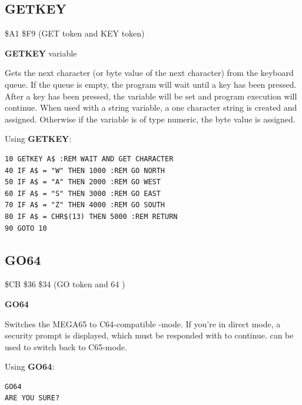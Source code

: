 \subsection{GETKEY}
\begin{description}[leftmargin=2cm,style=nextline]
\item [Token:] \$A1 \$F9 (GET token and KEY token)
\item [Format:] {\bf GETKEY} variable
\item [Usage:] Gets the next character (or byte value of the next character)
               from the keyboard queue. If the queue is empty,
               the program will wait until a key has been pressed.
               After a key has been pressed, the variable will be set
               and program execution will continue. When used with
               a string variable, a one character string is created and assigned.
               Otherwise if the variable is of type numeric, the byte value
               is assigned.

\item [Example:] Using {\bf GETKEY}:
\begin{tcolorbox}[colback=black,coltext=white]
\verbatimfont{\codefont}
\begin{verbatim}
10 GETKEY A$ :REM WAIT AND GET CHARACTER
40 IF A$ = "W" THEN 1000 :REM GO NORTH
50 IF A$ = "A" THEN 2000 :REM GO WEST
60 IF A$ = "S" THEN 3000 :REM GO EAST
70 IF A$ = "Z" THEN 4000 :REM GO SOUTH
80 IF A$ = CHR$(13) THEN 5000 :REM RETURN
90 GOTO 10
\end{verbatim}
\end{tcolorbox}
\end{description}


\newpage
\subsection{GO64}
\begin{description}[leftmargin=2cm,style=nextline]
\item [Token:] \$CB \$36 \$34 (GO token and 64 )
\item [Format:] {\bf GO64}
\item [Usage:] Switches the
               MEGA65 to C64-compatible -mode. If you're in direct
               mode, a security prompt 
               is displayed, which must be responded with  to
               continue.  can be used to switch back
               to C65-mode.

\item [Example:] Using {\bf GO64}:
\begin{tcolorbox}[colback=black,coltext=white]
\verbatimfont{\codefont}
\begin{verbatim}
GO64
ARE YOU SURE?
\end{verbatim}
\end{tcolorbox}
\end{description}

